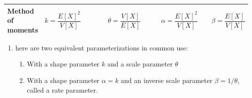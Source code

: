 \begin{alternateColorTable}
\begin{longtable}{|m{3cm}|p{5.5cm}|p{5.5cm}|}
    \textbf{Method of moments} &
    $
        {\displaystyle k={\dfrac {E[X]^{2}}{V[X]}}\quad \quad }
        \quad\quad
        {\displaystyle \theta ={\dfrac {V[X]}{E[X]}}\quad \quad }
    $&
    $
        {\displaystyle \alpha ={\dfrac {E[X]^{2}}{V[X]}}}
        \quad\quad
        {\displaystyle \beta ={\dfrac {E[X]}{V[X]}}}
    $
    \\[1ex] \hline

\end{longtable}
\renewcommand{\arraystretch}{1}
\end{alternateColorTable}

\begin{enumerate}
    \item here are two equivalent parameterizations in common use:
    \begin{enumerate}
        \item With a shape parameter $k$ and a scale parameter $\theta$

        \item With a shape parameter ${\displaystyle \alpha =k}$ and an inverse scale parameter ${\displaystyle \beta =1/\theta }$, called a rate parameter.

    \end{enumerate}

\end{enumerate}




































